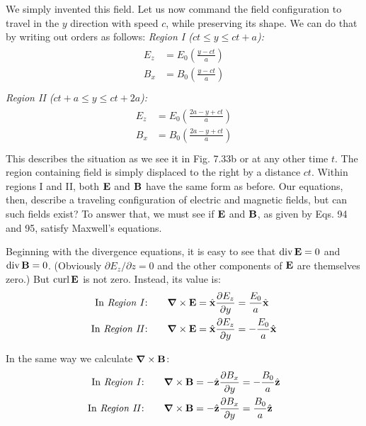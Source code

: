 We simply invented this field. Let us now command the field
configuration to travel in the $y$ direction with speed $c$, while preserving
its shape. We can do that by writing out orders as follows:
\linebreak[4]\noindent\emph{Region I ($ct \le y \le ct+a$):}
\begin{align}
\begin{split}
  E_z &= E_0 \left(\frac{y-ct}{a}\right) \\
  B_x &= B_0 \left(\frac{y-ct}{a}\right) \\
\end{split}
\end{align}
\emph{Region II ($ct+a \le y \le ct+2a$):}
\begin{align}
\begin{split}
  E_z &= E_0 \left(\frac{2a-y+ct}{a}\right) \\
  B_x &= B_0 \left(\frac{2a-y+ct}{a}\right) \\
\end{split}
\end{align}
This describes the situation as we see it in Fig. 7.33b or at any other
time $t$. The region containing field is simply displaced to the right
by a distance $ct$. Within regions I and II, both $\mathbf{E}$ and $\mathbf{B}$ have the same
form as before. Our equations, then, describe a traveling configuration
of electric and magnetic fields, but can such fields exist? To
answer that, we must see if $\mathbf{E}$ and $\mathbf{B}$, as given by Eqs. 94 and 95, satisfy
Maxwell's equations.

Beginning with the divergence equations, it is easy to see that
$\operatorname{div}\mathbf{E} = 0$ and $\operatorname{div}\mathbf{B} = 0$. (Obviously $\partial E_z/\partial z = 0$ and the other
components of $\mathbf{E}$ are themselves zero.) But $\operatorname{curl}\mathbf{E}$ is not zero.
Instead, its value is:
\begin{align}
\begin{split}
  \text{In \emph{Region I}:}  \qquad & \boldsymbol{\nabla}\times\mathbf{E} = \hat{\mathbf{x}} \frac{\partial E_z}{\partial y} 
                                                      = \frac{E_0}{a} \hat{\mathbf{x}} \\
  \text{In \emph{Region II}:} \qquad & \boldsymbol{\nabla}\times\mathbf{E} = \hat{\mathbf{x}} \frac{\partial E_z}{\partial y} 
                                                      = -\frac{E_0}{a} \hat{\mathbf{x}} 
\end{split}
\end{align}

In the same way we calculate $\boldsymbol{\nabla}\times\mathbf{B}$:
\begin{align}
\begin{split}
  \text{In \emph{Region I}:}  \qquad & \boldsymbol{\nabla}\times\mathbf{B} = -\hat{\mathbf{z}} \frac{\partial B_x}{\partial y} 
                                                      = -\frac{B_0}{a} \hat{\mathbf{z}} \\
  \text{In \emph{Region II}:} \qquad & \boldsymbol{\nabla}\times\mathbf{B} = -\hat{\mathbf{z}} \frac{\partial B_x}{\partial y} 
                                                      = \frac{B_0}{a} \hat{\mathbf{z}} 
\end{split}
\end{align}

